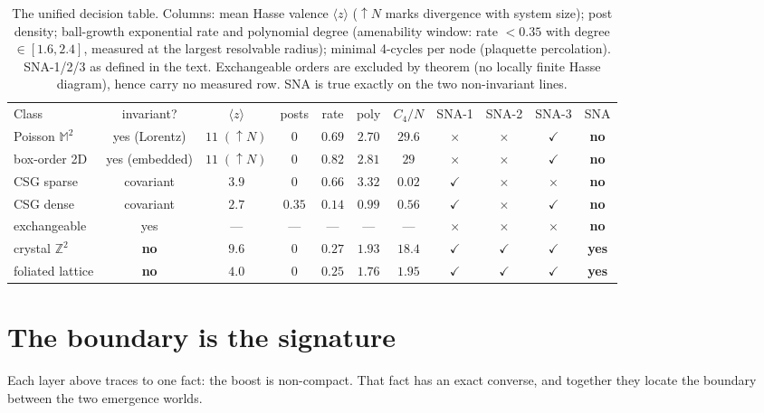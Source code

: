 \documentclass[aps,prd,reprint,nofootinbib,superscriptaddress,floatfix]{revtex4-2}
\begin{document}
\begin{table}[t]
\caption{\label{tab:sna}The unified decision table. Columns: mean Hasse valence
$\langle z\rangle$ ($\uparrow\!N$ marks divergence with system size); post density;
ball-growth exponential rate and polynomial degree (amenability window: rate $<0.35$
with degree $\in[1.6,2.4]$, measured at the largest resolvable radius); minimal
4-cycles per node (plaquette percolation). SNA-1/2/3 as defined in the text.
Exchangeable orders are excluded by theorem (no locally finite Hasse diagram), hence
carry no measured row. SNA is true exactly on the two non-invariant lines.}
\begin{ruledtabular}
\begin{tabular}{lcccccccccc}
Class & invariant? & $\langle z\rangle$ & posts & rate & poly & $C_4/N$ &
SNA-1 & SNA-2 & SNA-3 & SNA \\
\colrule
Poisson $\mathbb{M}^2$ & yes (Lorentz) & $11\;(\uparrow\!N)$ & $0$ & $0.69$ & $2.70$
 & $29.6$ & $\times$ & $\times$ & $\checkmark$ & \textbf{no} \\
box-order 2D & yes (embedded) & $11\;(\uparrow\!N)$ & $0$ & $0.82$ & $2.81$ & $29$
 & $\times$ & $\times$ & $\checkmark$ & \textbf{no} \\
CSG sparse & covariant & $3.9$ & $0$ & $0.66$ & $3.32$ & $0.02$
 & $\checkmark$ & $\times$ & $\times$ & \textbf{no} \\
CSG dense & covariant & $2.7$ & $0.35$ & $0.14$ & $0.99$ & $0.56$
 & $\checkmark$ & $\times$ & $\checkmark$ & \textbf{no} \\
exchangeable & yes & --- & --- & --- & --- & ---
 & $\times$ & $\times$ & $\times$ & \textbf{no} \\
crystal $\mathbb{Z}^2$ & \textbf{no} & $9.6$ & $0$ & $0.27$ & $1.93$ & $18.4$
 & $\checkmark$ & $\checkmark$ & $\checkmark$ & \textbf{yes} \\
foliated lattice & \textbf{no} & $4.0$ & $0$ & $0.25$ & $1.76$ & $1.95$
 & $\checkmark$ & $\checkmark$ & $\checkmark$ & \textbf{yes} \\
\end{tabular}
\end{ruledtabular}
\end{table}

\section{The boundary is the signature}

Each layer above traces to one fact: the boost is non-compact. That fact has an exact
converse, and together they locate the boundary between the two emergence worlds.
\end{document}
